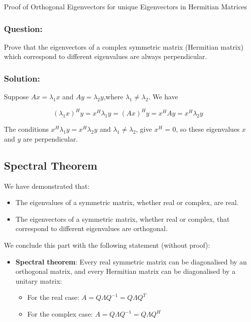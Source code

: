 \begin{examplebox}{Proof of Orthogonal Eigenvectors for unique Eigenvectors in Hermitian Matrices\\ }
\subsubsection*{Question:}
Prove that the eigenvectors of a complex symmetric matrix (Hermitian matrix) which correspond to different eigenvalues are always perpendicular.

\subsubsection*{Solution:}
Suppose $Ax = \lambda_1 x$ and $Ay = \lambda_2 y$,where $\lambda_1 \neq \lambda_2$. We have

\[(\lambda_1x)^Hy=x^H\lambda_1y=(Ax)^Hy=x^HAy=x^H\lambda_2y\]

The conditions $x^H \lambda_1 y = x^H \lambda_2 y$ and $\lambda_1 \neq \lambda_2$, give $x^H$ = 0, so these eigenvalues $x$ and $y$ are perpendicular.
\end{examplebox}

\subsection{Spectral Theorem}

We have demonstrated that:
\begin{itemize}
    \item The eigenvalues of a symmetric matrix, whether real or complex, are real.
    \item The eigenvectors of a symmetric matrix, whether real or complex, that correspond to different eigenvalues are orthogonal.
\end{itemize}

We conclude this part with the following statement (without proof):
\begin{itemize}
    \item \textbf{Spectral theorem}: Every real symmetric matrix can be diagonalised by an orthogonal matrix, and every Hermitian matrix can be diagonalised by a unitary matrix:
    \begin{itemize}
        \item For the real case: \( A = Q \Lambda Q^{-1} = Q \Lambda Q^T \)
        \item For the complex case: \( A = Q \Lambda Q^{-1} = Q \Lambda Q^H \)
    \end{itemize}
\end{itemize}

